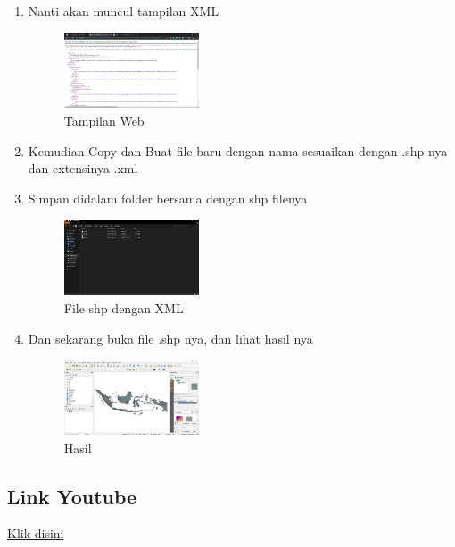 \begin{enumerate}
  \item Nanti akan muncul tampilan XML
  \hfill\break
    \begin{figure}[H]
		\includegraphics[width=4cm]{figures/1174031/4/20.png}
		\centering
		\caption{Tampilan Web}
    \end{figure}
  \item Kemudian Copy dan Buat file baru dengan nama sesuaikan dengan .shp nya dan extensinya .xml
  \item Simpan didalam folder bersama dengan shp filenya
  \hfill\break
  \begin{figure}[H]
  \includegraphics[width=4cm]{figures/1174031/4/21.png}
  \centering
  \caption{File shp dengan XML}
  \end{figure}
  \item Dan sekarang buka file .shp nya, dan lihat hasil nya
  \hfill\break
  \begin{figure}[H]
  \includegraphics[width=4cm]{figures/1174031/4/22.png}
  \centering
  \caption{Hasil}
  \end{figure}
\end{enumerate}
\subsection{Link Youtube}
\href{https://www.youtube.com/watch?v=mxGVF3C86jE}{Klik disini}